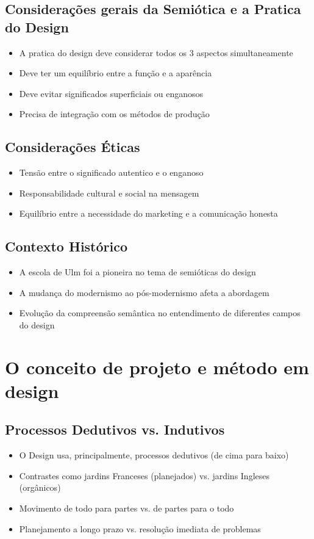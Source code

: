 \documentclass{article}
\begin{document}
\subsection{Considerações gerais da Semiótica e a Pratica do Design}
\begin{itemize}
    \item A pratica do design deve considerar todos os 3 aspectos simultaneamente
    \item Deve ter um equilíbrio entre a função e a aparência
    \item Deve evitar significados superficiais ou enganosos
    \item Precisa de integração com os métodos de produção
\end{itemize}
\subsection{Considerações Éticas}
\begin{itemize}
    \item Tensão entre o significado autentico e o enganoso
    \item Responsabilidade cultural e social na mensagem
    \item Equilíbrio entre a necessidade do marketing e a comunicação honesta
\end{itemize}
\subsection{Contexto Histórico}
\begin{itemize}
    \item A escola de Ulm foi a pioneira no tema de semióticas do design
    \item A mudança do modernismo ao pós-modernismo afeta a abordagem 
    \item Evolução da compreensão semântica no entendimento de diferentes campos do design
\end{itemize}

\section{O conceito de projeto e método em design}
\subsection{Processos Dedutivos vs. Indutivos}
\begin{itemize}
    \item O Design usa, principalmente, processos dedutivos (de cima para baixo)
    \item Contrastes como jardins Franceses (planejados) vs. jardins Ingleses (orgânicos)
    \item Movimento de todo para partes vs. de partes para o todo
    \item Planejamento a longo prazo vs. resolução imediata de problemas
\end{itemize}
\end{document}
